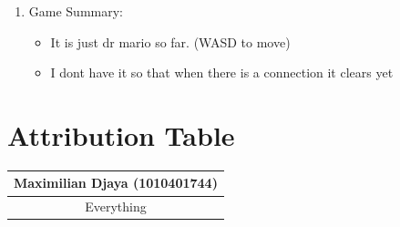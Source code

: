 \documentclass{article}
\begin{document}
\begin{enumerate}
\item Game Summary:
\begin{itemize}
\item It is just dr mario so far. (WASD to move)
\item I dont have it so that when there is a connection it clears yet
\end{itemize}

    
\end{enumerate}

\section{Attribution Table}

\begin{center}
\begin{tabular}{|| c ||}
\hline
 Maximilian Djaya (1010401744)\\ 
 \hline
 Everything
\end{tabular}
\end{center}

\end{document}
